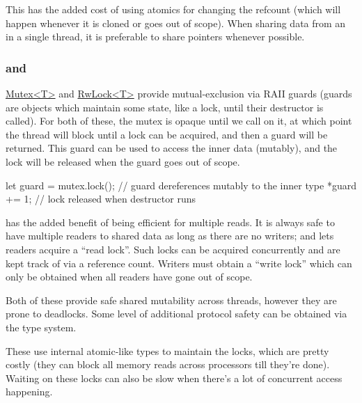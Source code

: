 
This has the added cost of using atomics for changing the refcount (which will happen whenever it is cloned or goes out 
of scope). When sharing data from an  in a single thread, it is preferable to share \code{\&} pointers whenever 
possible.

\subsubsection*{ and }

\href{https://doc.rust-lang.org/std/sync/struct.Mutex.html}{Mutex<T>} and 
\href{https://doc.rust-lang.org/std/sync/struct.RwLock.html}{RwLock<T>} provide mutual-exclusion via RAII guards (guards 
are objects which maintain some state, like a lock, until their destructor is called). For both of these, the mutex is 
opaque until we call  on it, at which point the thread will block until a lock can be acquired, and then a 
guard will be returned. This guard can be used to access the inner data (mutably), and the lock will be released when the 
guard goes out of scope.

\begin{rustc}
{
    let guard = mutex.lock();
    // guard dereferences mutably to the inner type
    *guard += 1;
} // lock released when destructor runs
\end{rustc}

 has the added benefit of being efficient for multiple reads. It is always safe to have multiple readers to 
shared data as long as there are no writers; and  lets readers acquire a \enquote{read lock}. Such locks can 
be acquired concurrently and are kept track of via a reference count. Writers must obtain a \enquote{write lock} which can 
only be obtained when all readers have gone out of scope.


Both of these provide safe shared mutability across threads, however they are prone to deadlocks. Some level of additional 
protocol safety can be obtained via the type system.


These use internal atomic-like types to maintain the locks, which are pretty costly (they can block all memory reads across 
processors till they're done). Waiting on these locks can also be slow when there's a lot of concurrent access happening.

